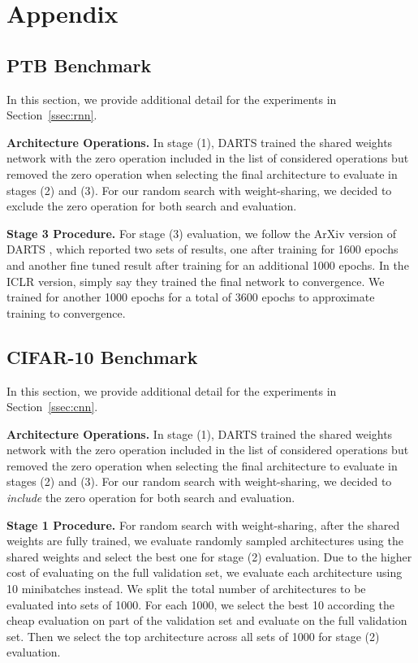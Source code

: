 \documentclass[acmlarge, nonacm]{acmart}
\begin{document}
\appendix
\section{Appendix}
\subsection{PTB Benchmark}
In this section, we provide additional detail for the experiments in Section~\ref{ssec:rnn}.

\textbf{Architecture Operations.} In stage (1), DARTS trained the shared weights network with the zero operation included in the list of considered operations but removed the zero operation when selecting the final architecture to evaluate in stages (2) and (3).  For our random search with weight-sharing, we decided to exclude the zero operation for both search and evaluation.

\textbf{Stage 3 Procedure.} For stage (3) evaluation, we follow the ArXiv version of DARTS \citep{dartsarxiv}, which reported two sets of results, one after training for 1600 epochs and another fine tuned result after training for an additional 1000 epochs.  In the ICLR version, \citet{liu2018darts} simply say they trained the final network to convergence.  We trained for another 1000 epochs for a total of 3600 epochs to approximate training to convergence.
\subsection{CIFAR-10 Benchmark}
\label{ssec:appendix_reproduce}
In this section, we provide additional detail for the experiments in Section~\ref{ssec:cnn}.

\textbf{Architecture Operations.} In stage (1), DARTS trained the shared weights network with the zero operation included in the list of considered operations but removed the zero operation when selecting the final architecture to evaluate in stages (2) and (3).  For our random search with weight-sharing, we decided to \emph{include} the zero operation for both search and evaluation.

\textbf{Stage 1 Procedure.}  For random search with weight-sharing, after the shared weights are fully trained, we evaluate randomly sampled architectures using the shared weights and select the best one for stage (2) evaluation.  Due to the higher cost of evaluating on the full validation set, we evaluate each architecture using 10 minibatches instead.  We split the total number of architectures to be evaluated into sets of 1000.  For each 1000, we select the best 10 according the cheap evaluation on part of the validation set and evaluate on the full validation set.  Then we select the top architecture across all sets of 1000 for stage (2) evaluation.
\end{document}
